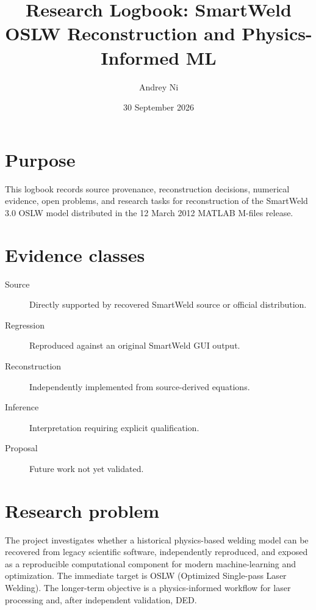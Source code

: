 \documentclass[11pt,a4paper]{article}
\title{Research Logbook: SmartWeld OSLW Reconstruction and Physics-Informed ML}
\author{Andrey Ni}
\date{30 September 2026}
\begin{document}
\maketitle
\section*{Purpose}
This logbook records source provenance, reconstruction decisions, numerical evidence,
open problems, and research tasks for reconstruction of the SmartWeld 3.0 OSLW model
distributed in the 12 March 2012 MATLAB M-files release.
\section*{Evidence classes}
\begin{description}
\item[Source] Directly supported by recovered SmartWeld source or official distribution.
\item[Regression] Reproduced against an original SmartWeld GUI output.
\item[Reconstruction] Independently implemented from source-derived equations.
\item[Inference] Interpretation requiring explicit qualification.
\item[Proposal] Future work not yet validated.
\end{description}
\section{Research problem}
The project investigates whether a historical physics-based welding model can be
recovered from legacy scientific software, independently reproduced, and exposed as
a reproducible computational component for modern machine-learning and optimization.
The immediate target is OSLW (Optimized Single-pass Laser Welding). The longer-term
objective is a physics-informed workflow for laser processing and, after independent
validation, DED.
\end{document}
